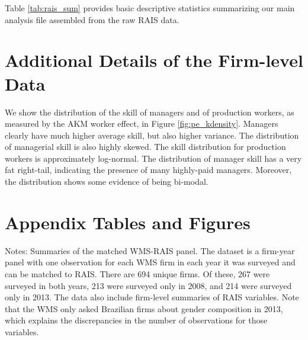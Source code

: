 Table \ref{tab:rais_sum} provides basic descriptive statistics summarizing our main analysis file assembled from the raw RAIS data.

\section{Additional Details of the Firm-level Data}

We show the distribution of the skill of managers and of production workers, as measured by the AKM worker effect, in Figure \ref{fig:pe_kdensity}.
Managers clearly have much higher average skill, but also higher variance. The distribution of managerial skill is also highly skewed. The skill distribution for production workers is approximately log-normal. The distribution of manager skill has a very fat right-tail, indicating the presence of many highly-paid managers. Moreover, the distribution shows some evidence of being bi-modal.


\clearpage
\section{Appendix Tables and Figures}

\clearpage
\begin{table}[h t]
    \caption{ \label{tab:wms_summ}}
    \begin{center}
    \scalebox{0.7}{
        
    }
    \end{center}
    \footnotesize{Notes: Summaries of the matched WMS-RAIS panel. The dataset is a firm-year panel with one observation for each WMS firm in each year it was surveyed
    and can be matched to RAIS. There are 694 unique firms. Of these, 267 were surveyed in both years, 213 were surveyed only in 2008, and 214 were surveyed only in 2013. 
    The data also include firm-level summaries of RAIS variables. Note that the WMS only asked Brazilian firms about gender composition in 2013, which explains the discrepancies in the
    number of observations for those variables.}
\end{table}

